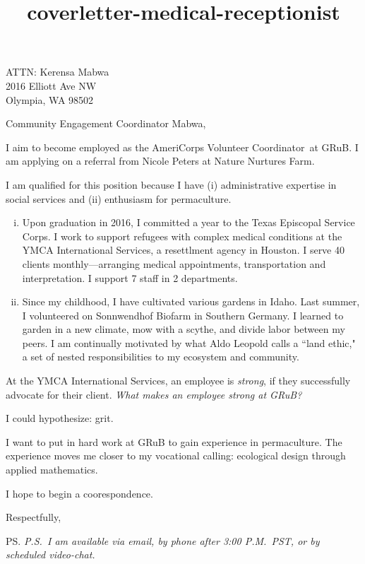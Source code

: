 \documentclass{letter}
\title{coverletter-medical-receptionist}
\newcommand{\jobtitle}{the AmeriCorps Volunteer Coordinator}
\newcommand{\company}{GRuB}
\begin{document}
\begin{letter}{ATTN: Kerensa Mabwa\\2016 Elliott Ave NW\\Olympia, WA 98502}
\opening{Community Engagement Coordinator Mabwa,}

I aim to become employed as \jobtitle\ at \company. I am applying on a referral from Nicole Peters at Nature Nurtures Farm. 

I am qualified for this position because I have (i) administrative expertise in social services and (ii) enthusiasm for permaculture.

\begin{enumerate}[(i)]
	\item Upon graduation in 2016, I committed a year to the Texas Episcopal Service Corps. I work to support refugees with complex medical conditions at the YMCA International Services, a resettlment agency in Houston. I serve 40 clients monthly---arranging medical appointments, transportation and interpretation. I support 7 staff in 2 departments.
	\item Since my childhood, I have cultivated various gardens in Idaho. Last summer, I volunteered on Sonnwendhof Biofarm in Southern Germany. I learned to garden in a new climate, mow with a scythe, and divide labor between my peers. I am continually motivated by what Aldo Leopold calls a ``land ethic," a set of nested responsibilities to my ecosystem and community.  
\end{enumerate}

At the YMCA International Services, an employee is \emph{strong}, if they successfully advocate for their client. \emph{What makes an employee strong at \company?} 

I could hypothesize: grit.

I want to put in hard work at GRuB to gain experience in permaculture. The experience moves me closer to my vocational calling: ecological design through applied mathematics.

I hope to begin a coorespondence.

\closing{Respectfully,}
\ps
\emph{P.S.\ I am available via email, by phone after 3:00 P.M.\ PST, or by scheduled video-chat.}

\end{letter}
\end{document}
